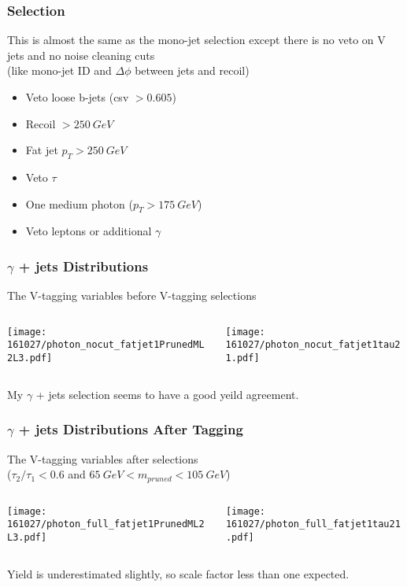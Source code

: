 \documentclass{beamer}
\begin{document}
\begin{frame}
  \frametitle{Selection}
  This is almost the same as the mono-jet selection except
  there is no veto on V jets and no noise cleaning cuts \\
  (like mono-jet ID and $\Delta\phi$ between jets and recoil)
  \begin{itemize}
  \item Veto loose b-jets (csv $> 0.605$)
  \item Recoil $> \SI{250}{GeV}$
  \item Fat jet $p_T > \SI{250}{GeV}$
  \item Veto $\tau$
  \item One medium photon ($p_T > \SI{175}{GeV}$)
  \item Veto leptons or additional $\gamma$
  \end{itemize}
\end{frame}

\begin{frame}
  \frametitle{$\gamma$ + jets Distributions}
  The V-tagging variables before V-tagging selections
  \begin{columns}
    \begin{column}{0.5\linewidth}
      \centering
      \texttt{[image: 161027/photon\_nocut\_fatjet1PrunedML2L3.pdf]}
    \end{column}
    \begin{column}{0.5\linewidth}
      \centering
      \texttt{[image: 161027/photon\_nocut\_fatjet1tau21.pdf]}
    \end{column}
  \end{columns}
  My $\gamma$ + jets selection seems to have a good yeild agreement.
\end{frame}

\begin{frame}
  \frametitle{$\gamma$ + jets Distributions After Tagging}
  The V-tagging variables after selections \\
  ($\tau_2/\tau_1 < 0.6$ and $\SI{65}{GeV} < m_{pruned} < \SI{105}{GeV}$)
  \begin{columns}
    \begin{column}{0.5\linewidth}
      \centering
      \texttt{[image: 161027/photon\_full\_fatjet1PrunedML2L3.pdf]}
    \end{column}
    \begin{column}{0.5\linewidth}
      \centering
      \texttt{[image: 161027/photon\_full\_fatjet1tau21.pdf]}
    \end{column}
  \end{columns}
  Yield is underestimated slightly, so scale factor less than one expected.
\end{frame}
\end{document}
